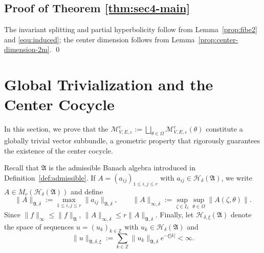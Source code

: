 \documentclass[reqno,11pt]{amsart}
\begin{document}
\subsection{Proof of Theorem \ref{thm:sec4-main}}
The invariant splitting and partial hyperbolicity follow from Lemma~\ref{prop:fibe2} and  \eqref{equ:induced}; the center dimension follows from Lemma~\ref{prop:center-dimension-2m}.
\qed




\section{Global Trivialization and the Center Cocycle}\label{trivial-center}

In this section, we prove that the $\boldsymbol{\mathcal M}^c_{V,E,\varepsilon}:=\bigsqcup_{\theta\in\Omega}\mathcal{M}_{V,E,\varepsilon}^c(\theta)$ constitute a globally trivial vector subbundle, a geometric property that rigorously guarantees the existence of the center cocycle. 


Recall that $\mathfrak A$ is the admissible Banach algebra introduced in Definition~\ref{def:admissible}. 
If $A=(a_{ij})_{1\le i,j\le r}$ with
$a_{ij}\in\mathcal H_\delta(\mathfrak A)$, we write 
$A\in M_r(\mathcal H_\delta(\mathfrak A))$
and define
$$\|A\|_{\mathfrak A,\delta}:=
\max_{1\le i,j\le r}\|a_{ij}\|_{\mathfrak A,\delta},
\qquad
\|A\|_{\infty,\delta}:=
\sup_{\zeta\in I_\delta}
\sup_{\theta\in\Omega}
\|A(\zeta,\theta)\|.$$
Since $\|f\|_\infty\le \|f\|_{\mathfrak A}$,
$\|A\|_{\infty,\delta}\le r\|A\|_{\mathfrak A,\delta}.$
Finally, let $\mathcal H_{\delta,\xi}(\mathfrak A)$ denote the space of sequences
$u=(u_k)_{k\in\mathbb Z}$ with $u_k\in\mathcal H_\delta(\mathfrak A)$ and
$$
\|u\|_{\mathfrak A,\delta,\xi}:=
\sum_{k\in\mathbb Z}\|u_k\|_{\mathfrak A,\delta}e^{-\xi|k|}
<\infty.
$$
\end{document}
